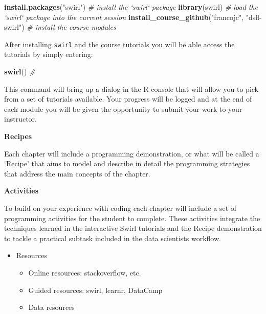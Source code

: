 \documentclass[]{book}
\newenvironment{Shaded}{\begin{snugshade}}{\end{snugshade}}
\newcommand{\CommentTok}[1]{\textcolor[rgb]{0.56,0.35,0.01}{\textit{#1}}}
\newcommand{\KeywordTok}[1]{\textcolor[rgb]{0.13,0.29,0.53}{\textbf{#1}}}
\newcommand{\NormalTok}[1]{#1}
\newcommand{\StringTok}[1]{\textcolor[rgb]{0.31,0.60,0.02}{#1}}
\providecommand{\tightlist}{%
  \setlength{\itemsep}{0pt}\setlength{\parskip}{0pt}}
\begin{document}
\begin{Shaded}
\begin{Highlighting}[]
\KeywordTok{install.packages}\NormalTok{(}\StringTok{"swirl"}\NormalTok{)  }\CommentTok{# install the `swirl` package}
\KeywordTok{library}\NormalTok{(swirl)  }\CommentTok{# load the `swirl` package into the current session}
\KeywordTok{install_course_github}\NormalTok{(}\StringTok{"francojc"}\NormalTok{, }\StringTok{"dsfl-swirl"}\NormalTok{)  }\CommentTok{# install the course modules}
\end{Highlighting}
\end{Shaded}

After installing \texttt{swirl} and the course tutorials you will be able access the tutorials by simply entering:

\begin{Shaded}
\begin{Highlighting}[]
\KeywordTok{swirl}\NormalTok{()  }\CommentTok{# }
\end{Highlighting}
\end{Shaded}

This command will bring up a dialog in the R console that will allow you to pick from a set of tutorials available. Your progress will be logged and at the end of each module you will be given the opportunity to submit your work to your instructor.

\textbf{Recipes}

Each chapter will include a programming demonstration, or what will be called a `Recipe' that aims to model and describe in detail the programming strategies that address the main concepts of the chapter.

\textbf{Activities}

To build on your experience with coding each chapter will include a set of programming activities for the student to complete. These activities integrate the techniques learned in the interactive Swirl tutorials and the Recipe demonstration to tackle a practical subtask included in the data scientists workflow.

\begin{itemize}
\tightlist
\item
  Resources

  \begin{itemize}
  \tightlist
  \item
    Online resources: stackoverflow, etc.
  \item
    Guided resources: swirl, learnr, DataCamp
  \item
    Data resources
  \end{itemize}
\end{itemize}
\end{document}
